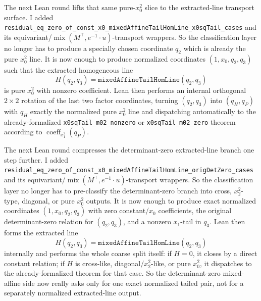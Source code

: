 \documentclass[11pt]{article}
\begin{document}
The next Lean round lifts that same pure-\(x_0^2\) slice to the extracted-line
transport surface. I added
\texttt{residual\_eq\_zero\_of\_const\_x0\_mixedAffineTailHomLine\_x0sqTail\_cases}
and its equivariant/\(\operatorname{mix}(M^\top,e^{-1}\!\cdot u)\)-transport
wrappers. So the classification layer no longer has to produce a specially
chosen coordinate \(q_2\) which is already the pure \(x_0^2\) line. It is now
enough to produce normalized coordinates \((1,x_0,q_2,q_3)\) such that the
extracted homogeneous line
\[
  H(q_2,q_3)=\texttt{mixedAffineTailHomLine}(q_2,q_3)
\]
is pure \(x_0^2\) with nonzero coefficient. Lean then performs an internal
orthogonal \(2\times 2\) rotation of the last two factor coordinates, turning
\((q_2,q_3)\) into \((q_H,q_P)\) with \(q_H\) exactly the normalized pure
\(x_0^2\) line and dispatching automatically to the already-formalized
\texttt{x0sqTail\_m02\_nonzero} or \texttt{x0sqTail\_m02\_zero} theorem
according to \(\operatorname{coeff}_{x_1^2}(q_P)\).

The next Lean round compresses the determinant-zero extracted-line branch one
step further. I added
\texttt{residual\_eq\_zero\_of\_const\_x0\_mixedAffineTailHomLine\_origDetZero\_cases}
and its equivariant/\(\operatorname{mix}(M^\top,e^{-1}\!\cdot u)\)-transport
wrappers. So the classification layer no longer has to pre-classify the
determinant-zero branch into cross, \(x_2^2\)-type, diagonal, or pure
\(x_0^2\) outputs. It is now enough to produce exact normalized coordinates
\((1,x_0,q_2,q_3)\) with zero constant/\(x_0\) coefficients, the original
determinant-zero relation for \((q_2,q_3)\), and a nonzero \(x_1\)-tail in
\(q_3\). Lean then forms the extracted line
\[
  H(q_2,q_3)=\texttt{mixedAffineTailHomLine}(q_2,q_3)
\]
internally and performs the whole coarse split itself: if \(H=0\), it closes
by a direct constant relation; if \(H\) is cross-like, diagonal/\(x_2^2\)-like,
or pure \(x_0^2\), it dispatches to the already-formalized theorem for that
case. So the determinant-zero mixed-affine side now really asks only for one
exact normalized tailed pair, not for a separately normalized extracted-line
output.
\end{document}
